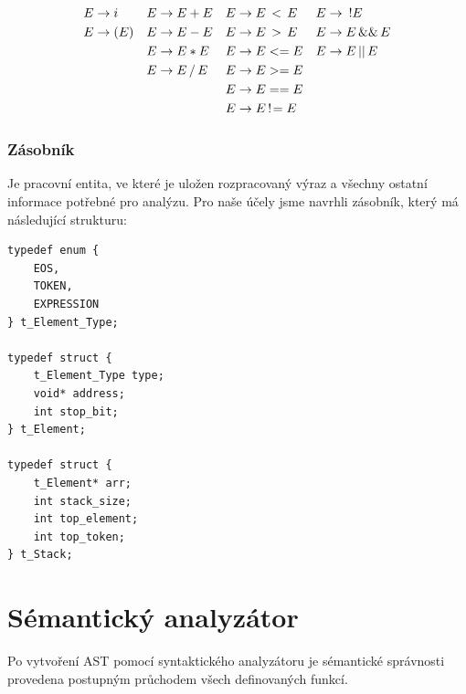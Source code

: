 \documentclass[a4paper,11pt]{article}
\begin{document}
\begin{align*}
E &\rightarrow i      &  E &\rightarrow E + E                      &  E &\rightarrow E \thinspace<\thinspace E    &  E &\rightarrow \enspace !E    \\
E &\rightarrow ( E )  &  E &\rightarrow E - E                      &  E &\rightarrow E \thinspace>\thinspace E    &  E &\rightarrow E \thinspace \&\& \thinspace E\\
  &                   &  E &\rightarrow E * E                      &  E &\rightarrow E <= E                       &  E &\rightarrow E \thinspace || \thinspace E\\
  &                   &  E &\rightarrow E\thinspace/\thinspace E   &  E &\rightarrow E >= E                       &    &                 \\
  &                   &    &                                       &  E &\rightarrow E == E                       &    &                 \\
  &                   &    &                                       &  E &\rightarrow E\thinspace!\!= E            &    &                 \\
\end{align*}

\subsubsection{Zásobník}
Je pracovní entita, ve které je uložen rozpracovaný výraz a všechny ostatní informace potřebné pro analýzu. Pro naše účely jsme navrhli zásobník, který má následující strukturu:

\begin{lstlisting}[caption={Struktura zásobníku}, label={lst:saStack}]
typedef enum {
    EOS,
    TOKEN,
    EXPRESSION
} t_Element_Type;

typedef struct {
    t_Element_Type type;
    void* address;
    int stop_bit;
} t_Element;

typedef struct {
    t_Element* arr;
    int stack_size;
    int top_element;
    int top_token;
} t_Stack;

\end{lstlisting}

\section{Sémantický analyzátor}
Po vytvoření AST pomocí syntaktického analyzátoru je sémantické správnosti provedena postupným průchodem všech definovaných funkcí.
\end{document}
